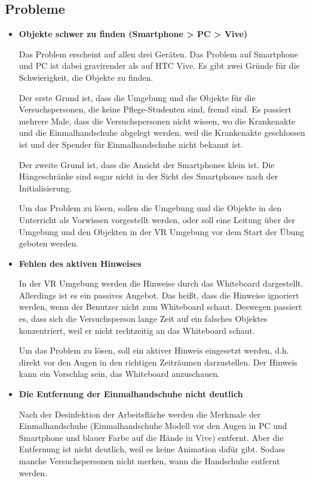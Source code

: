 \subsection{Probleme}
\begin{itemize}
    \item \textbf{Objekte schwer zu finden (Smartphone > PC > Vive)}
    
    Das Problem erscheint auf allen drei Geräten. Das Problem auf Smartphone und PC ist dabei gravirender als auf HTC Vive. Es gibt zwei Gründe für die Schwierigkeit, die Objekte zu finden.
    
    Der erste Grund ist, dass die Umgebung und die Objekte für die Versuchspersonen, die keine Pflege-Studenten sind, fremd sind. Es passiert mehrere Male, dass die Versuchspersonen nicht wissen, wo die Krankenakte und die Einmalhandschuhe abgelegt werden, weil die Krankenakte geschlossen ist und der Spender für Einmalhandschuhe nicht bekannt ist.
    
    Der zweite Grund ist, dass die Ansicht der Smartphones klein ist. Die Hängeschränke sind sogar nicht in der Sicht des Smartphones nach der Initialisierung.
    
    Um das Problem zu lösen, sollen die Umgebung und die Objekte in den Unterricht als Vorwissen vorgestellt werden, oder soll eine Leitung über der Umgebung und den Objekten in der VR Umgebung vor dem Start der Übung geboten werden.
  
    \item \textbf{Fehlen des aktiven Hinweises}
    
    In der VR Umgebung werden die Hinweise durch das Whiteboard dargestellt. Allerdings ist es ein passives Angebot. Das heißt, dass die Hinweise ignoriert werden, wenn der Benutzer nicht zum Whiteboard schaut. Deswegen passiert es, dass sich die Versuchsperson lange Zeit auf ein falsches Objektes konzentriert, weil er nicht rechtzeitig an das Whiteboard schaut.
    
    Um das Problem zu lösen, soll ein aktiver Hinweis eingesetzt werden, d.h. direkt vor den Augen in den richtigen Zeiträumen darzustellen. Der Hinweis kann ein Vorschlag sein, das Whiteboard anzuschauen.
    
    \item \textbf{Die Entfernung der Einmalhandschuhe nicht deutlich}
    
    Nach der Desinfektion der Arbeitsfläche werden die Merkmale der Einmalhandschuhe (Einmalhandschuhe Modell vor den Augen in PC und Smartphone und blauer Farbe auf die Hände in Vive) entfernt. Aber die Entfernung ist nicht deutlich, weil es keine Animation dafür gibt. Sodass manche Versuchspersonen nicht merken, wann die Handschuhe entfernt werden.
    

\end{itemize}
